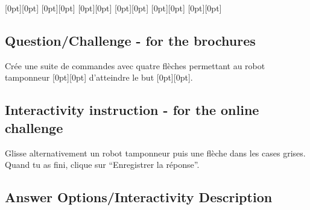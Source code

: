 \documentclass[a4paper,11pt]{report}
\newcommand{\taskGraphicsFolder}{..}
\begin{document}
{\centering%
\raisebox{-0.5ex}[0pt][0pt]{} \raisebox{-0.5ex}[0pt][0pt]{} \raisebox{-0.5ex}[0pt][0pt]{} \raisebox{-0.5ex}[0pt][0pt]{} \raisebox{-0.5ex}[0pt][0pt]{} \raisebox{-0.5ex}[0pt][0pt]{}

{\centering%
\par}\par}

{\em


\subsection*{Question/Challenge - for the brochures}

Crée une suite de commandes avec quatre flèches permettant au robot tamponneur \raisebox{-0.5ex}[0pt][0pt]{} d’atteindre le but \raisebox{-0.5ex}[0pt][0pt]{}.

{\centering%
{\centering%
\par}

{\centering%
\par}\par}

}


\subsection*{Interactivity instruction - for the online challenge}

Glisse alternativement un robot tamponneur puis une flèche dans les cases grises. Quand tu as fini, clique sur “Enregistrer la réponse”.

\begingroup
\renewcommand{\arraystretch}{1.5}
\subsection*{Answer Options/Interactivity Description}
\end{document}
